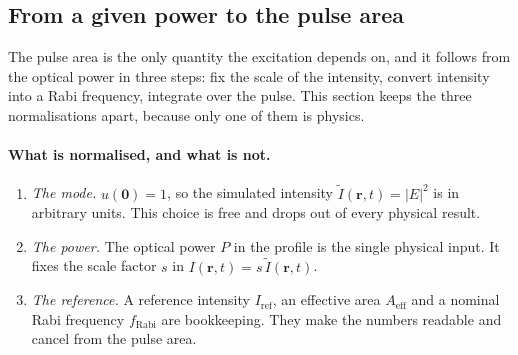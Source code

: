 \subsection{From a given power to the pulse area}

The pulse area is the only quantity the excitation depends on, and it follows
from the optical power in three steps: fix the scale of the intensity, convert
intensity into a Rabi frequency, integrate over the pulse. This section keeps
the three normalisations apart, because only one of them is physics.

\paragraph{What is normalised, and what is not.}
\begin{enumerate}
\item \emph{The mode.} $u(\mathbf 0)=1$, so the simulated intensity
      $\tilde I(\mathbf r,t)=|E|^2$ is in arbitrary units. This choice is free
      and drops out of every physical result.
\item \emph{The power.} The optical power $P$ in the profile is the single
      physical input. It fixes the scale factor $s$ in
      $I(\mathbf r,t)=s\,\tilde I(\mathbf r,t)$.
\item \emph{The reference.} A reference intensity $I_\mathrm{ref}$, an
      effective area $A_\mathrm{eff}$ and a nominal Rabi frequency
      $f_\mathrm{Rabi}$ are bookkeeping. They make the numbers readable and
      cancel from the pulse area.
\end{enumerate}

